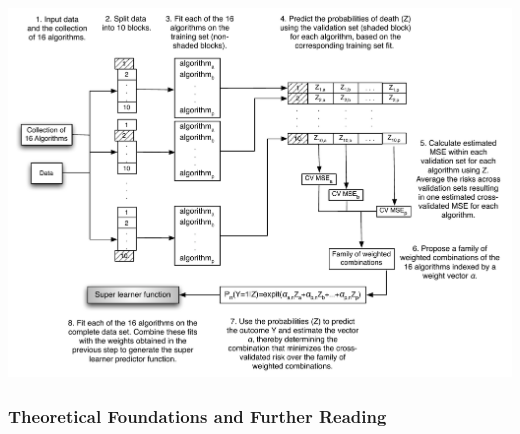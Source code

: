 \documentclass[12pt, krantz2,]{krantz}
\theoremstyle{definition}
\theoremstyle{definition}
\theoremstyle{definition}
\newcommand{\1}{\mathbbm{1}}
\begin{document}
\begin{center}\includegraphics[width=0.8\linewidth]{img/misc/SLKaiserNew} \end{center}

\hypertarget{theoretical-foundations-and-further-reading}{%
\subsubsection*{Theoretical Foundations and Further Reading}\label{theoretical-foundations-and-further-reading}}
\end{document}
